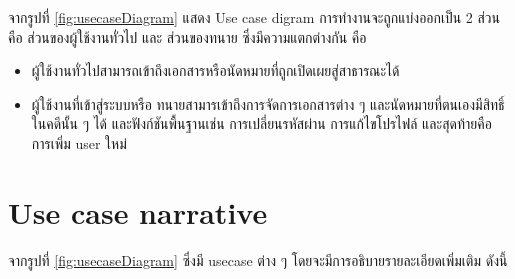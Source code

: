 \documentclass[12pt,oneside,openright,a4paper]{cpe-thai-project}
\begin{document}
\hspace*{1cm}จากรูปที่ \ref{fig:usecaseDiagram} แสดง Use case digram การทำงานจะถูกแบ่งออกเป็น 2 ส่วน คือ ส่วนของผู้ใช้งานทั่วไป และ ส่วนของทนาย ซึ่งมีความแตกต่างกัน คือ 
\begin{itemize}
    \item ผู้ใช้งานทั่วไปสามารถเข้าถึงเอกสารหรือนัดหมายที่ถูกเปิดเผยสู่สาธารณะได้ 
    \item ผู้ใช้งานที่เข้าสู่ระบบหรือ ทนายสามารเข้าถึงการจัดการเอกสารต่าง ๆ และนัดหมายที่ตนเองมีสิทธิ์ในคดีนั้น ๆ ได้ และฟังก์ชันพื้นฐานเช่น การเปลี่ยนรหัสผ่าน การแก้ไขโปรไฟล์ และสุดท้ายคือ การเพิ่ม user ใหม่ 
\end{itemize}


\clearpage
\section{Use case narrative}
\hspace*{1cm}จากรูปที่ \ref{fig:usecaseDiagram} ซึ่งมี usecase ต่าง ๆ โดยจะมีการอธิบายรายละเอียดเพิ่มเติม ดังนี้
\end{document}
